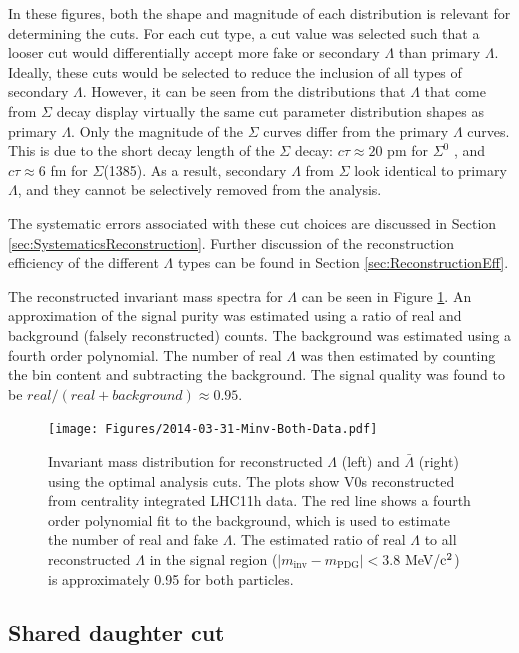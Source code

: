 In these figures, both the shape and magnitude of each distribution is relevant for determining the cuts. For each cut type, a cut value was selected such that a looser cut would differentially accept more fake or secondary $\Lambda$ than primary $\Lambda$. Ideally, these cuts would be selected to reduce the inclusion of all types of secondary $\Lambda$.  However, it can be seen from the distributions that $\Lambda$ that come from $\Sigma$ decay display virtually the same cut parameter distribution shapes as primary $\Lambda$.  Only the magnitude of the $\Sigma$ curves differ from the primary $\Lambda$ curves.  This is due to the short decay length of the $\Sigma$ decay: $c\tau \approx 20$ pm for $\Sigma^0$ , and $c\tau \approx 6$ fm for $\Sigma$(1385). As a result, secondary $\Lambda$ from $\Sigma$ look identical to primary $\Lambda$, and they cannot be selectively removed from the analysis.

The systematic errors associated with these cut choices are discussed in Section \ref{sec:SystematicsReconstruction}. Further discussion of the reconstruction efficiency of the different $\Lambda$ types can be found in Section \ref{sec:ReconstructionEff}.

The reconstructed invariant mass spectra for $\Lambda$ can be seen in Figure \ref{fig:BothInvMass}. An approximation of the signal purity was estimated using a ratio of real and background (falsely reconstructed) counts.  The background was estimated using a fourth order polynomial.  The number of real $\Lambda$ was then estimated by counting the bin content and subtracting the background. The signal quality was found to be $real/(real + background) \approx 0.95$.

\begin{figure}[hbtp]
\texttt{[image: Figures/2014-03-31-Minv-Both-Data.pdf]}
\caption[$\Lambda$ and $\bar{\Lambda}$ invariant mass distributions]{Invariant mass distribution for reconstructed $\Lambda$ (left) and $\bar{\Lambda}$ (right) using the optimal analysis cuts.  The plots show V0s reconstructed from centrality integrated LHC11h data.  The red line shows a fourth order polynomial fit to the background, which is used to estimate the number of real and fake $\Lambda$.  The estimated ratio of real $\Lambda$ to all reconstructed $\Lambda$ in the signal region ($ \lvert m_{\mathrm{inv}} - m_{\mathrm{PDG}}\rvert < 3.8$ MeV/$\rm c^2$) is approximately 0.95 for both particles.}
\label{fig:BothInvMass}
\end{figure}

\subsection{Shared daughter cut}

